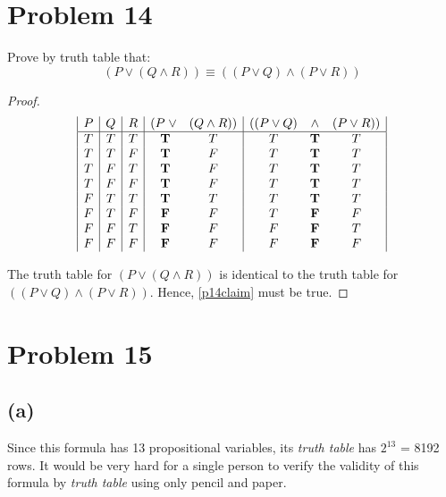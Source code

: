 \documentclass{article}
\begin{document}
\pagebreak

\section{Problem 14}
Prove by truth table that:
\begin{equation}\label{p14claim}
	(P \lor (Q \land R)) \equiv ((P \lor Q) \land (P \lor R))
\end{equation}

\begin{proof}
	\[
		\begin{array}{|c|c|c|c c|c c c|}
			P & Q & R & (P \; \lor    & (Q \land R)) & ((P \lor Q) & \land      & (P \lor R)) \\
			\hline
			T & T & T & \; \mathbf{T} & T            & T           & \mathbf{T} & T           \\
			T & T & F & \; \mathbf{T} & F            & T           & \mathbf{T} & T           \\
			T & F & T & \; \mathbf{T} & F            & T           & \mathbf{T} & T           \\
			T & F & F & \; \mathbf{T} & F            & T           & \mathbf{T} & T           \\
			F & T & T & \; \mathbf{T} & T            & T           & \mathbf{T} & T           \\
			F & T & F & \; \mathbf{F} & F            & T           & \mathbf{F} & F           \\
			F & F & T & \; \mathbf{F} & F            & F           & \mathbf{F} & T           \\
			F & F & F & \; \mathbf{F} & F            & F           & \mathbf{F} & F
		\end{array}
	\]

	The truth table for $(P \lor (Q \land R))$ is identical to the truth table for $((P \lor Q) \land (P \lor R))$. Hence, \eqref{p14claim} must be true.
\end{proof}

\pagebreak

\section{Problem 15}
\subsection{(a)}
Since this formula has 13 propositional variables, its
\textit{truth table} has $2^13$ = 8192 rows. It would be very hard for a single person to verify the validity of this formula by \textit{truth table} using only pencil and paper.
\end{document}
